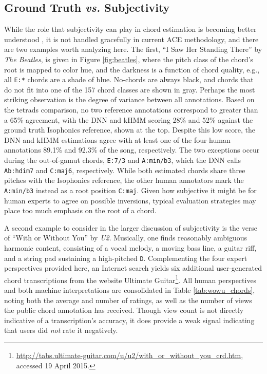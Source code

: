 \documentclass{article}
\begin{document}
\subsection{Ground Truth \emph{vs.} Subjectivity}

While the role that subjectivity can play in chord estimation is becoming better understood \cite{Ni2013Understanding}, it is not handled gracefully in current ACE methodology, and there are two examples worth analyzing here.
The first, ``I Saw Her Standing There'' by \emph{The Beatles}, is given in Figure \ref{fig:beatles}, where the pitch class of the chord's root is mapped to color hue, and the darkness is a function of chord quality, e.g., all \texttt{E:*} chords are a shade of blue.
No-chords are always black, and chords that do not fit into one of the 157 chord classes are shown in gray.
Perhaps the most striking observation is the degree of variance between all annotations.
Based on the tetrads comparison, no two reference annotations correspond to greater than a 65\% agreement, with the DNN and kHMM scoring 28\% and 52\% against the ground truth Isophonics reference, shown at the top.
Despite this low score, the DNN and kHMM estimations agree with at least one of the four human annotations 89.1\% and 92.3\% of the song, respectively.
The two exceptions occur during the out-of-gamut chords, \texttt{E:7/3} and \texttt{A:min/b3}, which the DNN calls \texttt{Ab:hdim7} and \texttt{C:maj6}, respectively.
While both estimated chords share three pitches with the Isophonics reference, the other human annotators mark the \texttt{A:min/b3} instead as a root position \texttt{C:maj}.
Given how subjective it might be for human experts to agree on possible inversions, typical evaluation strategies may place too much emphasis on the root of a chord.

A second example to consider in the larger discussion of subjectivity is the verse of ``With or Without You'' by \emph{U2}.
Musically, one finds reasonably ambiguous harmonic content, consisting of a vocal melody, a moving bass line, a guitar riff, and a string pad sustaining a high-pitched \texttt{D}.
Complementing the four expert perspectives provided here, an Internet search yields six additional user-generated chord transcriptions from the website Ultimate Guitar\footnote{\url{http://tabs.ultimate-guitar.com/u/u2/with_or_without_you_crd.htm}, accessed 19 April 2015.}.
All human perspectives and both machine interpretations are consolidated in Table \ref{tab:wowu_chords}, noting both the average and number of ratings, as well as the number of views the public chord annotation has received.
Though view count is not directly indicative of a transcription's accuracy, it does provide a weak signal indicating that users did \emph{not} rate it negatively.
\end{document}
